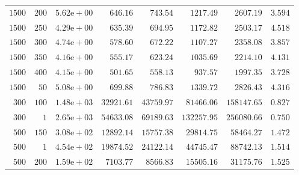 \begin{table}
{\begin{tabular}{rrlrrrrr}
    $1500$ & $200$ & $5.62\text{e}+00$ & $646.16$ & $743.54$ & $1217.49$ & $2607.19$ & $3.594$ \\
    $1500$ & $250$ & $4.29\text{e}+00$ & $635.39$ & $694.95$ & $1172.82$ & $2503.17$ & $4.518$ \\
    $1500$ & $300$ & $4.74\text{e}+00$ & $578.60$ & $672.22$ & $1107.27$ & $2358.08$ & $3.857$ \\
    $1500$ & $350$ & $4.16\text{e}+00$ & $555.17$ & $623.24$ & $1035.69$ & $2214.10$ & $4.131$ \\
    $1500$ & $400$ & $4.15\text{e}+00$ & $501.65$ & $558.13$ & $937.57$ & $1997.35$ & $3.728$ \\
    $1500$ & $50$ & $5.08\text{e}+00$ & $699.88$ & $786.83$ & $1339.72$ & $2826.43$ & $4.316$ \\
    $300$ & $100$ & $1.48\text{e}+03$ & $32921.61$ & $43759.97$ & $81466.06$ & $158147.65$ & $0.827$ \\
    $300$ & $1$ & $2.65\text{e}+03$ & $54633.08$ & $69189.63$ & $132257.95$ & $256080.66$ & $0.750$ \\
    $500$ & $150$ & $3.08\text{e}+02$ & $12892.14$ & $15757.38$ & $29814.75$ & $58464.27$ & $1.472$ \\
    $500$ & $1$ & $4.54\text{e}+02$ & $19874.52$ & $24122.14$ & $44745.47$ & $88742.13$ & $1.514$ \\
    $500$ & $200$ & $1.59\text{e}+02$ & $7103.77$ & $8566.83$ & $15505.16$ & $31175.76$ & $1.525$ \\


\end{tabular}}
\end{table}
